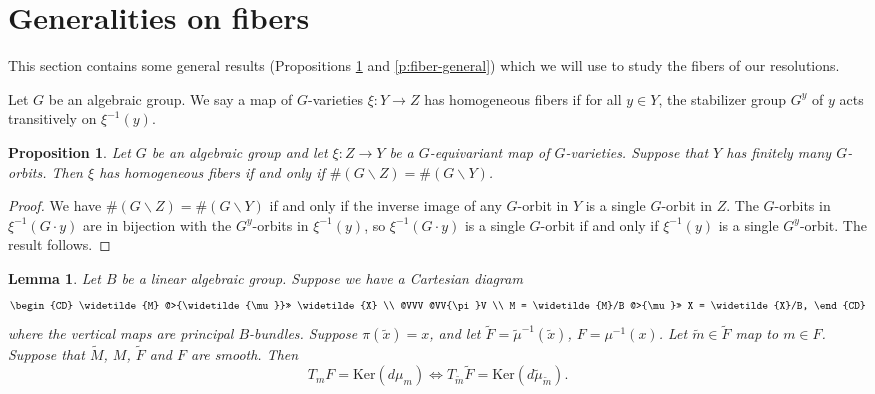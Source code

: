 \documentclass[11pt,letterpaper,reqno]{amsart}
\numberwithin{equation}{section}
\theoremstyle{plain}
\newtheorem{lemma}[theorem]{Lemma}
\newtheorem{proposition}[theorem]{Proposition}
\theoremstyle{definition}
\theoremstyle{remark}
\begin{document}
\section{Generalities on fibers} \label{s:fiber-gen}
This section contains some general results (Propositions \ref{p:homogeneous} and \ref{p:fiber-general}) which we will use to study the fibers
of our resolutions.

Let $G$ be an algebraic group.  We say a map of $G$-varieties $\xi: Y \to Z$ has homogeneous fibers if for all  $y\in Y$, the stabilizer group $G^y$ of $y$
 acts transitively on $\xi^{-1}(y)$.

\begin{proposition} \label{p:homogeneous}
Let $G$ be an algebraic group and let $\xi:Z\rightarrow Y$ be a $G$-equivariant map of $G$-varieties. Suppose that $Y$ has finitely many $G$-orbits. Then
$\xi$ has homogeneous fibers if and only if $\#(G\backslash Z)=\#(G\backslash Y)$.
\end{proposition}

\begin{proof}
We have $\#(G\backslash Z)=\#(G\backslash Y)$ if and only if the inverse image of any $G$-orbit in $Y$ is a single $G$-orbit
in $Z$.  The $G$-orbits in $\xi^{-1}(G \cdot y)$ are in bijection with the $G^y$-orbits in $\xi^{-1}(y)$, so $\xi^{-1}(G \cdot y)$ is a single
$G$-orbit if and only if $\xi^{-1}(y)$ is a single $G^y$-orbit.  The result follows.
\end{proof}

\begin{lemma} \label{l:changefiber}
Let $B$ be a linear algebraic group.  Suppose we have a Cartesian diagram
$$
\begin{CD}
\widetilde{M} @>{\widetilde{\mu}}>> \widetilde{X} \\
@VVV @VV{\pi}V \\
M = \widetilde{M}/B @>{\mu}>> X = \widetilde{X}/B,
\end{CD}
$$
where the vertical maps are principal $B$-bundles.  Suppose $\pi(\widetilde{x}) = x$, and let $\widetilde{F} = \widetilde{\mu}^{-1}(\widetilde{x})$,
$F = \mu^{-1}(x)$.  Let $\widetilde{m} \in \widetilde{F}$ map to $m \in F$.  Suppose that $\widetilde{M}$, $M$, $\widetilde{F}$ and $F$ are smooth. Then
$$
T_m F = \mathrm{Ker}(d\mu_m) \Leftrightarrow T_{\widetilde{m}} \widetilde{F} = \mathrm{Ker}(d\widetilde{\mu}_{\widetilde{m}}) .
$$
\end{lemma}
\end{document}
